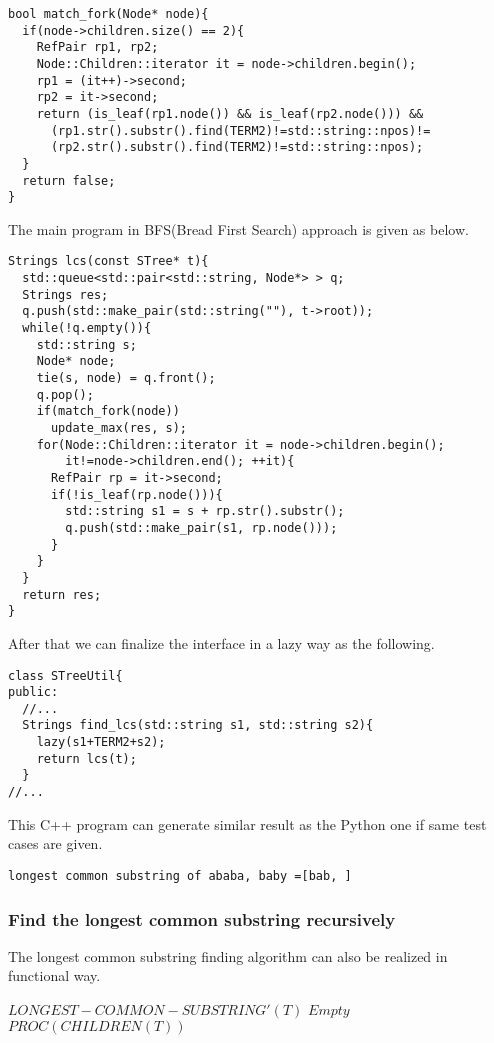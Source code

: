 \documentclass{article}
\begin{document}
\begin{lstlisting}
bool match_fork(Node* node){
  if(node->children.size() == 2){
    RefPair rp1, rp2;
    Node::Children::iterator it = node->children.begin();
    rp1 = (it++)->second;
    rp2 = it->second;
    return (is_leaf(rp1.node()) && is_leaf(rp2.node())) &&
      (rp1.str().substr().find(TERM2)!=std::string::npos)!=
      (rp2.str().substr().find(TERM2)!=std::string::npos);
  }
  return false;
}
\end{lstlisting}

The main program in BFS(Bread First Search) approach is given
as below.

\begin{lstlisting}
Strings lcs(const STree* t){
  std::queue<std::pair<std::string, Node*> > q;
  Strings res;
  q.push(std::make_pair(std::string(""), t->root));
  while(!q.empty()){
    std::string s;
    Node* node;
    tie(s, node) = q.front();
    q.pop();
    if(match_fork(node))
      update_max(res, s);
    for(Node::Children::iterator it = node->children.begin();
        it!=node->children.end(); ++it){
      RefPair rp = it->second;
      if(!is_leaf(rp.node())){
        std::string s1 = s + rp.str().substr();
        q.push(std::make_pair(s1, rp.node()));
      }
    }
  }
  return res;
}
\end{lstlisting}

After that we can finalize the interface in a lazy way as the following.

\begin{lstlisting}
class STreeUtil{
public:
  //...
  Strings find_lcs(std::string s1, std::string s2){
    lazy(s1+TERM2+s2);
    return lcs(t);
  }
//...
\end{lstlisting}

This C++ program can generate similar result as the Python one if same
test cases are given.

\begin{verbatim}
longest common substring of ababa, baby =[bab, ]
\end{verbatim}

\subsubsection{Find the longest common substring recursively}
The longest common substring finding algorithm can also be
realized in functional way.

\begin{algorithmic}
\STATE $LONGEST-COMMON-SUBSTRING'(T)$
    \RETURN $Empty$
  \ELSE
    \RETURN $PROC(CHILDREN(T))$
  \ENDIF
\end{algorithmic}
\end{document}
